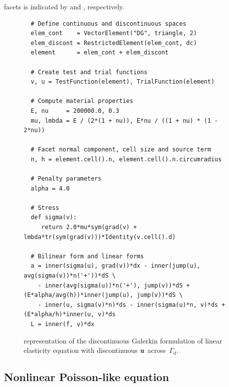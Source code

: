 facets is indicated by  and , respectively.
%
\begin{figure} \footnotesize
\begin{verbatim}
  # Define continuous and discontinuous spaces
  elem_cont    = VectorElement("DG", triangle, 2)
  elem_discont = RestrictedElement(elem_cont, dc)
  element      = elem_cont + elem_discont

  # Create test and trial functions
  v, u = TestFunction(element), TrialFunction(element)

  # Compute material properties
  E, nu     = 200000.0, 0.3
  mu, lmbda = E / (2*(1 + nu)), E*nu / ((1 + nu) * (1 - 2*nu))

  # Facet normal component, cell size and source term
  n, h = element.cell().n, element.cell().n.circumradius

  # Penalty parameters
  alpha = 4.0

  # Stress
  def sigma(v):
     return 2.0*mu*sym(grad(v) + lmbda*tr(sym(grad(v)))*Identity(v.cell().d)

  # Bilinear form and linear forms
  a = inner(sigma(u), grad(v))*dx - inner(jump(u), avg(sigma(v))*n('+'))*dS \
    - inner(avg(sigma(u))*n('+'), jump(v))*dS + (E*alpha/avg(h))*inner(jump(u), jump(v))*dS \
    - inner(u, sigma(v)*n)*ds - inner(sigma(u)*n, v)*ds + (E*alpha/h)*inner(u, v)*ds
  L = inner(f, v)*dx
\end{verbatim}
\caption{{\ufl} representation of the discontinuous Galerkin formulation of
linear elasticity equation with discontinuous $\boldsymbol{u}$ across~$\Gamma_{d}$.}
\label{nikbakht:code:dg-elasticity}
\end{figure}
\subsection{Nonlinear Poisson-like equation}

